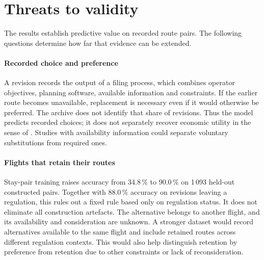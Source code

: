 \documentclass[preprint,authoryear,12pt]{elsarticle}
\begin{document}
\section{Threats to validity}
\label{sec:validity}

The results establish predictive value on recorded route pairs.
The following questions determine how far that evidence can be extended.

\paragraph{Recorded choice and preference}
A revision records the output of a filing process, which combines
operator objectives, planning software, available information and
constraints. If the earlier route becomes unavailable, replacement is
necessary even if it would otherwise be preferred. The archive does
not identify that share of revisions. Thus the model predicts recorded
choices; it does not separately recover economic utility in the sense
of \citet{samuelson1938}. Studies with availability information could
separate voluntary substitutions from required ones.

\paragraph{Flights that retain their routes}
Stay-pair training raises accuracy from 34.8\,\% to 90.0\,\% on
1\,093 held-out constructed pairs. Together with 88.0\,\% accuracy
on revisions leaving a regulation, this rules out a fixed rule based
only on regulation status. It does not eliminate all construction
artefacts. The alternative belongs to another flight, and its
availability and consideration are unknown. A stronger dataset would
record alternatives available to the same flight and include retained
routes across different regulation contexts. This would also help
distinguish retention by preference from retention due to other
constraints or lack of reconsideration.
\end{document}
